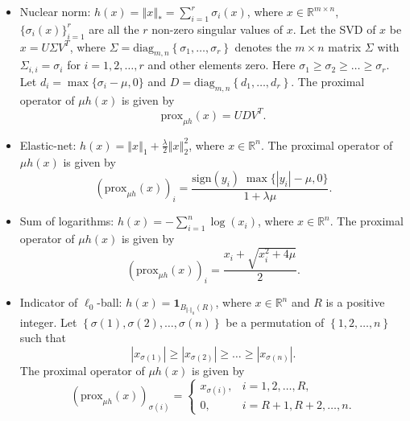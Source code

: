 \documentclass[a4paper]{article}
\newcommand{\norm}[1]{\left\Vert#1\right\Vert}
\newcommand{\mr}{\mathbb{R}}
\newcommand{\prox}{\mathrm{prox}}
\newcommand{\sign}{\mathrm{sign}}
\newcommand{\mi}{\mathbf{1}}
\newcommand{\diag}{\mathrm{diag}}
\begin{document}
\begin{itemize}
    \item {Nuclear norm:} $h(x) = \norm{x}_* = \sum_{i = 1}^{r} 
    \sigma_i(x)$, where $x \in \mr^{m \times n}$, $\{ \sigma_i(x) 
    \}_{i=1}^r$ are all the $r$ non-zero singular values of $x$. Let 
    the SVD of $x$ be $x = U \Sigma V^T$, where $\Sigma = 
    \diag_{m,n}\left\{ \sigma_1, \ldots, \sigma_r \right\}$ denotes 
    the 
    $m \times n$ matrix $\Sigma$ with $\Sigma_{i,i} = \sigma_i$ for 
    $i 
    = 1, 2, \ldots, r$ and other elements zero. Here $\sigma_1 \ge 
    \sigma_2 \ge \ldots \ge \sigma_r$. Let $d_i = \max\{ 
    \sigma_i - \mu, 0 \}$ and $D = \diag_{m,n}\left\{ d_1, \ldots, 
    d_r 
    \right\}$. The proximal operator of $\mu h(x)$ is given by
    \begin{displaymath}
      \prox_{\mu h}(x) = U D V^T.
    \end{displaymath}
    
    \item {Elastic-net:} $h(x) = \norm{x}_1 + \frac{\lambda}{2} 
    \norm{x}_2^2$, where $x \in \mr^n$. The proximal operator of $\mu 
    h(x)$ is given by
    \begin{displaymath}
      (\prox_{\mu h}(x))_i =  \frac{\sign(y_i) \; \max\{ |y_i| - \mu, 
        0 
        \}}{1 + \lambda \mu}.
    \end{displaymath}
    
    \item {Sum of logarithms:} $h(x) = -\sum_{i=1}^{n} \log(x_i)$, 
    where $x \in \mr^n$. The proximal operator of $\mu h(x)$ 
    is given by
    \begin{displaymath}
      (\prox_{\mu h}(x))_i = \frac{x_i + \sqrt{x_i^2 + 4\mu}}{2}.
    \end{displaymath}
    
    \item {Indicator of $\ell_0$-ball:} $h(x) = 
    \mi_{B_{\norm{\cdot}_0}(R)}$, where $x \in \mr^n$ and $R$ is a 
    positive integer. Let $\left\{ \sigma(1), \sigma(2), \ldots, 
    \sigma(n) \right\}$ be a permutation of $\left\{  1, 2, \ldots, n 
    \right\}$ such that 
    \begin{displaymath}
      |x_{\sigma(1)}| \ge |x_{\sigma(2)}| \ge \ldots \ge 
      |x_{\sigma(n)}|.
    \end{displaymath}
    The proximal operator of $\mu h(x)$ is given by
    \begin{displaymath}
      (\prox_{\mu h}(x))_{\sigma(i)} = 
      \begin{cases}
        x_{\sigma(i)}, & i = 1, 2, \ldots, R, \\
        0, & i = R + 1, R + 2, \ldots, 
        n.
      \end{cases}
    \end{displaymath}
  

\end{itemize}
\end{document}
